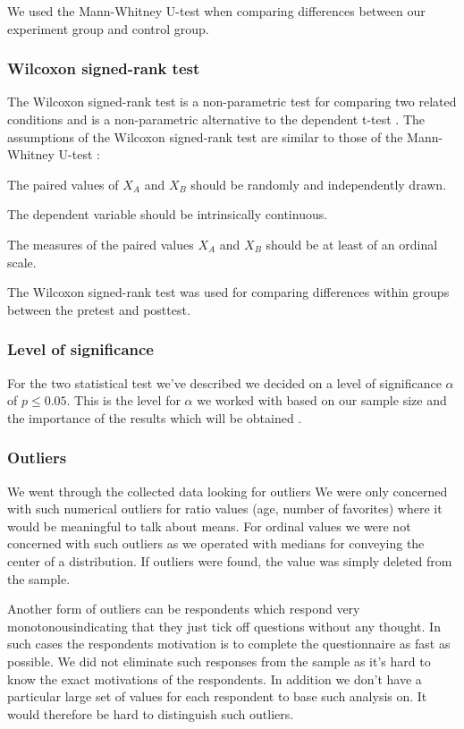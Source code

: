 We used the Mann-Whitney U-test when comparing differences between our
experiment group and control group.

\subsubsection{Wilcoxon signed-rank test}

The Wilcoxon signed-rank test is a non-parametric test for comparing two
related conditions and is a non-parametric alternative to the
dependent t-test \citep[]{field05}.
The assumptions of the Wilcoxon signed-rank test are similar to those
of the Mann-Whitney U-test \citep[]{lowry08}:

\begin{enum}
  \item The paired values of $X_A$ and $X_B$
    should be randomly and independently drawn.
  \item The dependent variable should be intrinsically continuous.
  \item The measures of the paired values $X_A$ and $X_B$
    should be at least of an ordinal scale.
\end{enum}

The Wilcoxon signed-rank test was used for comparing differences within
groups between the pretest and posttest.

\subsubsection{Level of significance}
\label{section:empirical.method.data.analysis.level.of.significance}

For the two statistical test we've described we decided on a level
of significance $\alpha$ of $p \leq 0.05$.
This is the level for $\alpha$ we worked with based on
our sample size and the importance of the results which will be obtained
\citep[]{siegel88}.

\subsubsection{Outliers}

We went through the collected data looking for outliers
\dash{}
We were only concerned with such numerical outliers for ratio values
(age, number of favorites) where it would be meaningful to talk about means.
For ordinal values we were not concerned with such outliers as we operated
with medians for conveying the center of a distribution.
If outliers were found, the value was simply deleted from the sample.

Another form of outliers can be respondents which respond very
monotonous\dash{}indicating that they just tick off questions without any
thought. In such cases the respondents motivation is to complete the
questionnaire as fast as possible. We did not eliminate such responses from
the sample as it's hard to know the exact motivations of the respondents.
In addition we don't have a particular large set of values for each respondent
to base such analysis on. It would therefore be hard to distinguish such
outliers.
